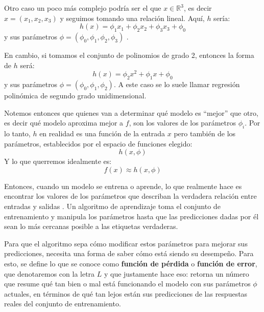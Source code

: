 \documentclass[../../main.tex]{subfiles}
\begin{document}
Otro caso un poco más complejo podría ser el que \(x \in \mathbb{R}^3\), es decir
\(x=(x_1, x_2, x_3)\) y seguimos tomando una relación lineal. Aquí, \(h\) sería:
\[h(x) = \phi_1 x_1 + \phi_2 x_2 + \phi_3 x_3 + \phi_0\] y sus parámetros \(\phi=(\phi_0,
\phi_1, \phi_2, \phi_3)\)\footnotemark
{}.

En cambio, si tomamos el conjunto de polinomios de grado 2, entonces la forma de \(h\) será:
\[h(x) = \phi_2 x^2 + \phi_1 x + \phi_0\] y sus parámetros \(\phi=(\phi_0, \phi_1,
\phi_2)\). A este caso se lo suele llamar regresión polinómica de segundo grado
unidimensional.

Notemos entonces que quienes van a determinar qué modelo es ``mejor'' que otro, es decir
qué modelo aproxima mejor a \(f\), son los valores de los parámetros \(\phi_i\). Por lo
tanto, \(h\) en realidad es una función de la entrada \(x\) pero también de los
parámetros, establecidos por el espacio de funciones elegido:
\[h(x, \phi)\]
Y lo que querremos idealmente es:
\[f(x) \approx h(x, \phi)\]

Entonces, cuando un modelo se entrena o aprende, lo que realmente hace es encontrar los
valores de los parámetros que describan la verdadera relación entre entradas y salidas
\cite{prince2024understanding}. Un algoritmo de aprendizaje toma el conjunto de
entrenamiento y manipula los parámetros hasta que las predicciones dadas por él sean lo
más cercanas posible a las etiquetas verdaderas.

Para que el algoritmo sepa cómo modificar estos parámetros para mejorar sus predicciones,
necesita una forma de saber cómo está siendo su desempeño. Para esto, se define lo que se
conoce como \textbf{función de pérdida} o \textbf{función de error}, que denotaremos con
la letra \(L\) y que justamente hace eso: retorna un número que resume qué tan bien o mal
está funcionando el modelo con sus parámetros \(\phi\) actuales, en términos de qué tan
lejos están sus predicciones de las respuestas reales del conjunto de entrenamiento.
\end{document}
